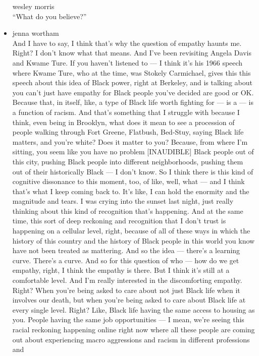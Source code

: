 \begin{itemize}
  wesley morris\\
  ``What do you believe?''
\item
  jenna wortham\\
  And I have to say, I think that's why the question of empathy haunts
  me. Right? I don't know what that means. And I've been revisiting
  Angela Davis and Kwame Ture. If you haven't listened to --- I think
  it's his 1966 speech where Kwame Ture, who at the time, was Stokely
  Carmichael, gives this this speech about this idea of Black power,
  right at Berkeley, and is talking about you can't just have empathy
  for Black people you've decided are good or OK. Because that, in
  itself, like, a type of Black life worth fighting for --- is a --- is
  a function of racism. And that's something that I struggle with
  because I think, even being in Brooklyn, what does it mean to see a
  procession of people walking through Fort Greene, Flatbush, Bed-Stuy,
  saying Black life matters, and you're white? Does it matter to you?
  Because, from where I'm sitting, you seem like you have no problem
  {[}INAUDIBLE{]} Black people out of this city, pushing Black people
  into different neighborhoods, pushing them out of their historically
  Black --- I don't know. So I think there is this kind of cognitive
  dissonance to this moment, too, of like, well, what --- and I think
  that's what I keep coming back to. It's like, I can hold the enormity
  and the magnitude and tears. I was crying into the sunset last night,
  just really thinking about this kind of recognition that's happening.
  And at the same time, this sort of deep reckoning and recognition that
  I don't trust is happening on a cellular level, right, because of all
  of these ways in which the history of this country and the history of
  Black people in this world you know have not been treated as
  mattering. And so the idea --- there's a learning curve. There's a
  curve. And so for this question of who --- how do we get empathy,
  right, I think the empathy is there. But I think it's still at a
  comfortable level. And I'm really interested in the discomforting
  empathy. Right? When you're being asked to care about not just Black
  life when it involves our death, but when you're being asked to care
  about Black life at every single level. Right? Like, Black life having
  the same access to housing as you. People having the same job
  opportunities --- I mean, we're seeing this racial reckoning happening
  online right now where all these people are coming out about
  experiencing macro aggressions and racism in different professions and

\end{itemize}
